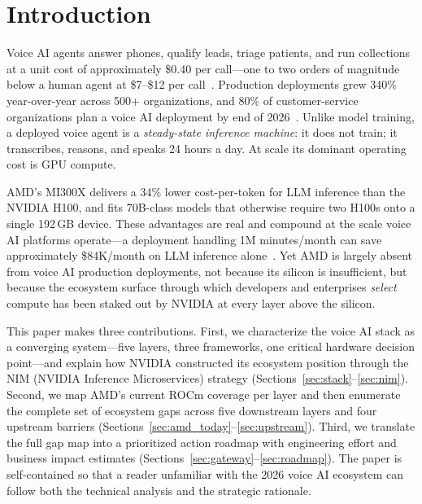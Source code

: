 \documentclass[blind]{gtac}
\begin{document}
\section{Introduction}
\label{sec:intro}

Voice AI agents answer phones, qualify leads, triage patients, and run collections at a unit cost of approximately \$0.40 per call---one to two orders of magnitude below a human agent at \$7--\$12 per call~\cite{assemblyai_2026,grandview}. Production deployments grew 340\% year-over-year across 500+ organizations, and 80\% of customer-service organizations plan a voice AI deployment by end of 2026~\cite{assemblyai_2026}. Unlike model training, a deployed voice agent is a \emph{steady-state inference machine}: it does not train; it transcribes, reasons, and speaks 24 hours a day. At scale its dominant operating cost is GPU compute.

AMD's MI300X delivers a 34\% lower cost-per-token for LLM inference than the NVIDIA H100, and fits 70B-class models that otherwise require two H100s onto a single 192\,GB device. These advantages are real and compound at the scale voice AI platforms operate---a deployment handling 1M minutes/month can save approximately \$84K/month on LLM inference alone~\cite{spheron_rocm,vllm_rocm}. Yet AMD is largely absent from voice AI production deployments, not because its silicon is insufficient, but because the ecosystem surface through which developers and enterprises \emph{select} compute has been staked out by NVIDIA at every layer above the silicon.

This paper makes three contributions. First, we characterize the voice AI stack as a converging system---five layers, three frameworks, one critical hardware decision point---and explain how NVIDIA constructed its ecosystem position through the NIM (NVIDIA Inference Microservices) strategy (Sections~\ref{sec:stack}--\ref{sec:nim}). Second, we map AMD's current ROCm coverage per layer and then enumerate the complete set of ecosystem gaps across five downstream layers and four upstream barriers (Sections~\ref{sec:amd_today}--\ref{sec:upstream}). Third, we translate the full gap map into a prioritized action roadmap with engineering effort and business impact estimates (Sections~\ref{sec:gateway}--\ref{sec:roadmap}). The paper is self-contained so that a reader unfamiliar with the 2026 voice AI ecosystem can follow both the technical analysis and the strategic rationale.
\end{document}
